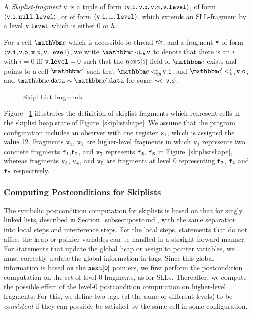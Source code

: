 \begin{definition}
\label{def:sll-fragment}
A {\em Skiplist-fragment} $\mathtt{v}$
is a tuple of form
$\left\langle\mathtt{v}.\mathtt{i},\mathtt{v}.\mathtt{o},\mathtt{v}.\phi,\mathtt{v}.\mathtt{level}\right\rangle$, of form
$\left\langle\mathtt{v}.\mathtt{i},{\tt null},\mathtt{level}\right\rangle$, or of form
$\left\langle\mathtt{v}.\mathtt{i},\bot,\mathtt{level}\right\rangle$,
which extends an SLL-fragment by a level $\mathtt{v}.\mathtt{level}$ which is either $0$ or $h$.
\end{definition}
For a cell $\cell$ which is accessible to thread ${\tt th}$, and a fragment
$\mathtt{v}$ of form $\left\langle\mathtt{v}.\mathtt{i},\mathtt{v}.\mathtt{o},\mathtt{v}.\phi,\mathtt{v}.\mathtt{level}\right\rangle$,
we write $\cell \satfrag{\thread}\frag$ to denote that
there is an $i$ with $i= 0$ iff $\mathtt{v}.\mathtt{level} = 0$ such that
the ${\tt next[i]}$ field of $\cell$ exists and points to a cell $\cell'$ such that
$\cell \satslfrag{\thread}{i} \inat{\frag}$, and
$\cell' \satslfrag{\thread}{i} \outat{\frag}$, and
$\cell.\mathtt{data} \sim \cell'.\mathtt{data}$ for some $\sim \in \mathtt{v}.\phi$.
 \begin{figure}  
  
 \caption{Skipl-List fragments}
 \label{skiplistabs}
\end{figure}
Figure ~\ref{skiplistabs} illustrates the definition of skiplist-fragments
which represent cells in the skiplist heap state of Figure~\ref{skiplistshape}.
We assume that the program configuration includes an observer with one
register $\mathtt{x}_1$, which is assigned the value 12.
Fragments $\tt v_1$, $\tt v_2$ are higher-level
fragments in which $\tt v_1$ represents two concrete fragments $\tt f_1$,$\tt f_2$, and $\tt v_2$ represents $\tt f_5$, $\tt f_6$ in Figure~\ref{skiplistshape}, whereas fragments $\tt v_3$, $\tt v_4$, and $\tt v_5$ are
fragments at level $0$ representing $\tt f_3$, $\tt f_4$ and $\tt f_7$ respectively.
 
\subsubsection{Computing Postconditions for Skiplists}
\label{subsect:postcond-skiplists}
The symbolic postcondition computation for skiplists is based on that for
singly linked lists, described in Section~\ref{subsect:postcond}, with the
same separation into local steps and interference steps.
For the local steps, statements that do not affect the heap or pointer
variables can be handled in a straight-forward manner.
For statements that update the global heap or assign to pointer variables,
we must correctly update the global information in tags.
Since this global information is based on the $\tt next[0]$ pointers,
we first perform the postcondition computation on the set of
level-0 fragments, as for SLLs. Thereafter, we compute the possible
effect of the level-0 postcondition computation  on higher-level fragments.
For this, we define two tags (of the same or different levels)
to be {\em consistent} if they can possibly be satisfied by the same
cell in some configuration.

